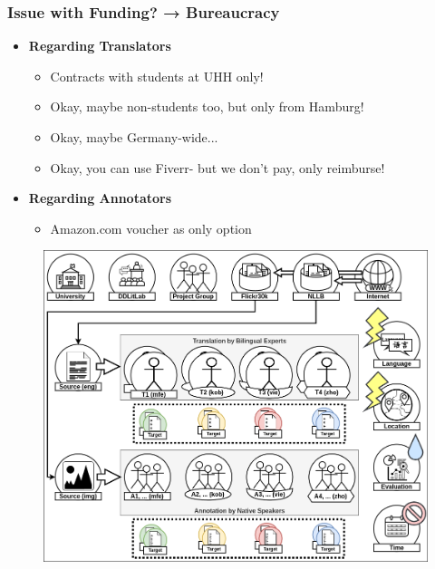 \documentclass[aspectratio=169]{beamer}
\begin{document}
\begin{frame}[fragile]
	\frametitle{Issue with Funding? → Bureaucracy}
    \begin{minipage}{.50\textwidth}
        \centering
        \begin{itemize}
            \item \textbf{Regarding Translators}
            \begin{itemize}
                \item Contracts with students at UHH only!
                \item Okay, maybe non-students too, but only from Hamburg!
                \item Okay, maybe Germany-wide...
                \item Okay, you can use Fiverr- but we don't pay, only reimburse!
            \end{itemize}
            \item \textbf{Regarding Annotators}
            \begin{itemize}
                \item Amazon.com voucher as only option
            \end{itemize}
        \end{itemize}
    \end{minipage}%
    \begin{minipage}{.50\textwidth}
    \centering
        \begin{figure}
            \includegraphics[width=1.0\textwidth]{images/MTACR-Overview.png} 
        \end{figure}
    \end{minipage}
\end{frame}
\end{document}
